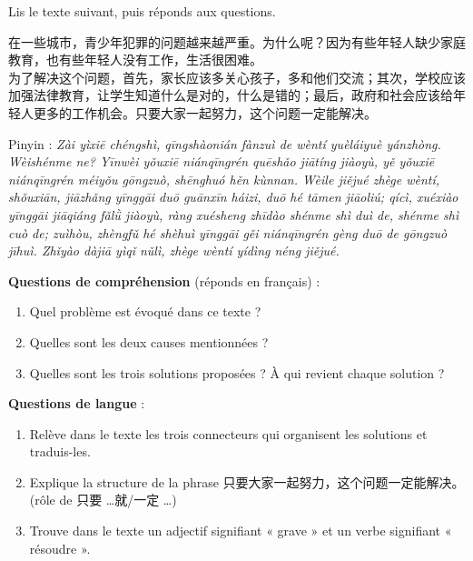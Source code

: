 \documentclass[11pt]{article}
\begin{document}
\begin{exercice}
Lis le texte suivant, puis réponds aux questions.
\begin{textebox}
在一些城市，青少年犯罪的问题越来越严重。为什么呢？因为有些年轻人缺少家庭教育，也有些年轻人没有工作，生活很困难。\\
为了解决这个问题，首先，家长应该多关心孩子，多和他们交流；其次，学校应该加强法律教育，让学生知道什么是对的，什么是错的；最后，政府和社会应该给年轻人更多的工作机会。只要大家一起努力，这个问题一定能解决。
\end{textebox}
Pinyin : \emph{Zài yìxiē chéngshì, qīngshàonián fànzuì de wèntí yuèláiyuè yánzhòng. Wèishénme ne? Yīnwèi yǒuxiē niánqīngrén quēshǎo jiātíng jiàoyù, yě yǒuxiē niánqīngrén méiyǒu gōngzuò, shēnghuó hěn kùnnan. Wèile jiějué zhège wèntí, shǒuxiān, jiāzhǎng yīnggāi duō guānxīn háizi, duō hé tāmen jiāoliú; qícì, xuéxiào yīnggāi jiāqiáng fǎlǜ jiàoyù, ràng xuésheng zhīdào shénme shì duì de, shénme shì cuò de; zuìhòu, zhèngfǔ hé shèhuì yīnggāi gěi niánqīngrén gèng duō de gōngzuò jīhuì. Zhǐyào dàjiā yìqǐ nǔlì, zhège wèntí yídìng néng jiějué.}

\textbf{Questions de compréhension} (réponds en français) :
\begin{enumerate}
\item Quel problème est évoqué dans ce texte ?
\item Quelles sont les deux causes mentionnées ?
\item Quelles sont les trois solutions proposées ? À qui revient chaque solution ?
\end{enumerate}
\textbf{Questions de langue} :
\begin{enumerate}
\item Relève dans le texte les trois connecteurs qui organisent les solutions et traduis-les.
\item Explique la structure de la phrase 只要大家一起努力，这个问题一定能解决。(rôle de 只要 \ldots 就/一定 \ldots)
\item Trouve dans le texte un adjectif signifiant « grave » et un verbe signifiant « résoudre ».
\end{enumerate}
\end{exercice}
\end{document}
